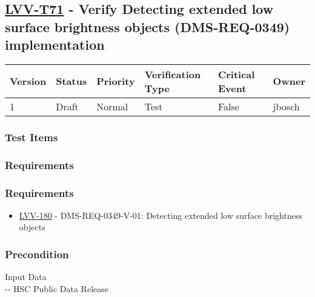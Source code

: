 \hypertarget{lvv-t71---verify-detecting-extended-low-surface-brightness-objects-dms-req-0349-implementation}{%
\subsection{\texorpdfstring{\href{https://jira.lsstcorp.org/secure/Tests.jspa\#/testCase/LVV-T71}{LVV-T71}
- Verify Detecting extended low surface brightness objects
(DMS-REQ-0349)
implementation}{LVV-T71 - Verify Detecting extended low surface brightness objects (DMS-REQ-0349) implementation}}\label{lvv-t71---verify-detecting-extended-low-surface-brightness-objects-dms-req-0349-implementation}}

\begin{longtable}[]{@{}llllll@{}}
\toprule
Version & Status & Priority & Verification Type & Critical Event &
Owner\tabularnewline
\midrule
\endhead
1 & Draft & Normal & Test & False & jbosch\tabularnewline
\bottomrule
\end{longtable}

\hypertarget{test-items-5}{%
\subsubsection{Test Items}\label{test-items-5}}

\hypertarget{requirements-10}{%
\subsubsection{Requirements}\label{requirements-10}}

\hypertarget{requirements-11}{%
\subsubsection{Requirements}\label{requirements-11}}

\begin{itemize}
\tightlist
\item
  \href{https://jira.lsstcorp.org/browse/LVV-180}{LVV-180} -
  DMS-REQ-0349-V-01: Detecting extended low surface brightness objects
\end{itemize}

\hypertarget{precondition}{%
\subsubsection{Precondition}\label{precondition}}

Input Data\\
\hspace*{0.333em}-\/- HSC Public Data Release

